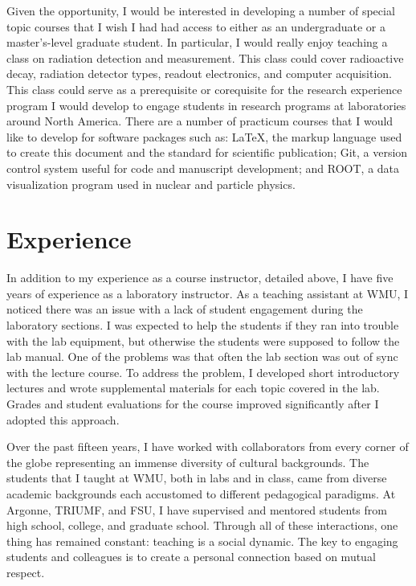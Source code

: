 {%
Given the opportunity, 
I would be interested in developing a number of special topic courses that I wish I had had access to either as an undergraduate or a master's-level graduate student. In particular, I would really enjoy teaching a class on radiation detection and measurement. This class could cover radioactive decay, radiation detector types, readout electronics, and computer acquisition. This class could serve as a prerequisite or corequisite for the research experience program I would develop to engage students in research programs at laboratories around North America.
There are a number of practicum courses 
that I would like to %
develop for software packages such as: %
\LaTeX, the markup language used to create this document and the standard for scientific publication; Git, a version control system useful for code and manuscript development; and ROOT, a data visualization program used in nuclear and particle physics.

\def\secname{Experience}
\section*{\hspace{-\parindent}\secname}
\addcontentsline{toc}{section}{\secname}%
In addition to my experience as a course instructor, detailed above, I have five years of experience as a laboratory instructor.
As a teaching assistant at WMU, I noticed there  was an issue with a lack of student engagement during the laboratory sections. I was expected to help the students if they ran into trouble with the lab equipment, but otherwise the students were supposed to follow the lab manual. One of the problems was that often the lab section was out of sync with the lecture course. To address the problem, I developed short introductory lectures and wrote supplemental materials for each topic covered in the lab. Grades and student evaluations for the course improved significantly after I adopted this approach.

Over the past fifteen years, I have worked with collaborators from every corner of the globe representing an immense diversity of cultural backgrounds.
The students that I taught at WMU, both in labs and in class, came from diverse academic backgrounds each accustomed to different pedagogical paradigms.
At Argonne, TRIUMF, and FSU, I have supervised and mentored students from high school, college, and graduate school.
Through all of these interactions, one thing has remained constant: teaching is a social dynamic. The key to engaging students and colleagues is to create a personal connection based on mutual respect.

%
}
\cvfootersimple{}